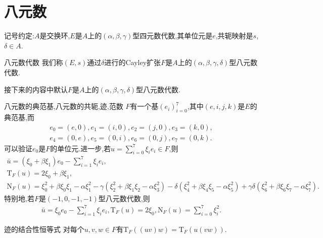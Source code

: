 \section{八元数}

记号约定:$A$是交换环,$E$是$A$上的$\left(\alpha,\beta,\gamma\right)$型四元数代数,其单位元是$e$,共轭映射是$s$,$\delta\in A$.

\begin{definition}{八元数代数}{}
	我们称$\left(E,s\right)$通过$\delta$进行的Cayley扩张$F$是$A$上的$\left(\alpha,\beta,\gamma,\delta\right)$型八元数代数.
\end{definition}

接下来的内容中默认$F$是$A$上的$\left(\alpha,\beta,\gamma,\delta\right)$型八元数代数.

\begin{proposition}{八元数的典范基,八元数的共轭,迹,范数}{}
	$F$有一个基$\left(e_{i}\right)_{i=0}^{7}$,其中$\left(e,i,j,k\right)$是$E$的典范基,而
	\begin{gather*}
		e_{0}=\left(e,0\right),e_{1}=\left(i,0\right),e_{2}=\left(j,0\right),e_{3}=\left(k,0\right),\\
		e_{4}=\left(0,e\right),e_{5}=\left(0,i\right),e_{6}=\left(0,j\right),e_{7}=\left(0,k\right).
	\end{gather*}
	可以验证$e_{0}$是$F$的单位元.进一步,若$u=\sum\limits_{i=0}^{7}\xi_{i}e_{i}\in F$,则
	\begin{gather*}
		\bar{u}=\left(\xi_{0}+\beta\xi_{1}\right)e_{0}-\sum\limits_{i=1}^{7}\xi_{i}e_{i},\\
		\mathrm{T}_{F}\left(u\right)=2\xi_{0}+\beta\xi_{1},\\
		\mathrm{N}_{F}\left(u\right)=\xi_{0}^{2}+\beta\xi_{0}\xi_{1}-\alpha\xi_{1}^{2}-\gamma\left(\xi_{2}^{2}+\beta\xi_{1}\xi_{2}-\alpha\xi_{3}^{2}\right)-\delta\left(\xi_{4}^{2}+\beta\xi_{4}\xi_{5}-\alpha\xi_{5}^{2}\right)+\gamma\delta\left(\xi_{6}^{2}+\beta\xi_{6}\xi_{7}-\alpha\xi_{7}^{2}\right).
	\end{gather*}
	特别地,若$F$是$\left(-1,0,-1,-1\right)$型八元数代数,则
	\begin{align*}
		\bar{u}=\xi_{0}e_{0}-\sum\limits_{i=1}^{7}\xi_{i}e_{i},\mathrm{T}_{F}\left(u\right)=2\xi_{0},\mathrm{N}_{F}\left(u\right)=\sum\limits_{i=0}^{7}\xi_{i}^{2}.
	\end{align*}
\end{proposition}

\begin{proposition}{迹的结合性恒等式}{}
	对每个$u,v,w\in F$有$\mathrm{T}_{F}\left(\left(uv\right)w\right)=\mathrm{T}_{F}\left(u\left(vw\right)\right)$.
\end{proposition}

